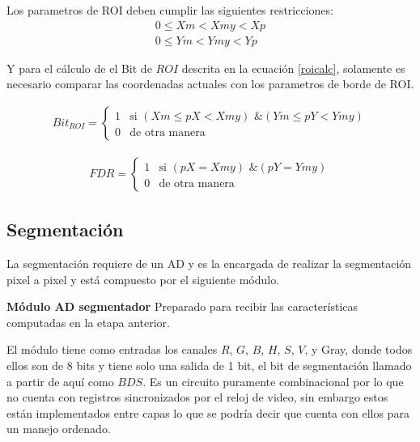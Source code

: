 \documentclass[twoside,spanish,ESP,MSc]{plantillaLabUPV}
\theoremstyle{definition}
\begin{document}
Los parametros de ROI deben cumplir las siguientes restricciones: %
\begin{equation} \label{rois}
\begin{gathered} 
0 \leq Xm < Xmy < Xp \\
0 \leq Ym < Ymy < Yp 
\end{gathered}
\end{equation}

Y para el cálculo de el Bit de $ROI$ descrita en la ecuación \ref{roicalc}, solamente es necesario comparar las coordenadas actuales con los parametros de borde de ROI.

\begin{equation} \label{roicalc}
\begin{gathered} 
Bit_{ROI} = \left \{ \begin{matrix}
				1 & \mbox{si } (Xm \leq pX < Xmy) \mbox{ \& } (Ym \leq pY < Ymy)\\
				0 & \mbox{de otra manera}  
			\end{matrix}\right. 
\end{gathered}
\end{equation}

\begin{equation} \label{roilast}
\begin{gathered} 
FDR = \left \{ \begin{matrix}
1 & \mbox{si } (pX = Xmy) \mbox{ \& } (pY = Ymy)\\
0 & \mbox{de otra manera}  
\end{matrix}\right. 
\end{gathered}
\end{equation}

\subsection{Segmentación}
La segmentación requiere de un AD y es la encargada de realizar la segmentación pixel a pixel y está compuesto por el siguiente módulo.

\checkmark\textbf{Módulo AD segmentador}
Preparado para recibir las características computadas en la etapa anterior. 

El módulo tiene como entradas los canales $R$, $G$, $B$, $H$, $S$, $V$, y Gray, donde todos ellos son de 8 bits y tiene solo una salida de 1 bit, el bit de segmentación llamado a partir de aquí como $BDS$. Es un circuito puramente combinacional por lo que no cuenta con registros sincronizados por el reloj de video, sin embargo estos están implementados entre capas lo que se podría decir que cuenta con ellos para un manejo ordenado.
 
\end{document}
